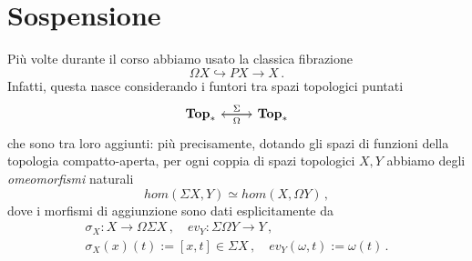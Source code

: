 

\section{Sospensione}

Più volte durante il corso abbiamo usato la classica fibrazione
\begin{equation*}
	\Omega X \hookrightarrow PX \longrightarrow X\,.
\end{equation*}
Infatti, questa nasce considerando i funtori tra
spazi topologici puntati
\begin{equation*}
	\begin{tikzcd}
		\cat{Top}_{*} \ar[r, "\Sigma"] & \cat{Top}_{*} \ar[l, "\Omega"]
	\end{tikzcd}
\end{equation*}
che sono tra loro aggiunti: più precisamente, dotando
gli spazi di funzioni della topologia compatto-aperta,
per ogni coppia di spazi topologici $X,Y$ abbiamo degli 
\emph{omeomorfismi} naturali
\begin{equation*}
	hom(\Sigma X, Y) \simeq hom(X, \Omega Y)\,,
\end{equation*}
dove i morfismi di aggiunzione sono dati esplicitamente da
\begin{align*}
	\sigma_{X} : X \longrightarrow \Omega \Sigma X\,, \quad
	ev_{Y} : \Sigma \Omega Y \longrightarrow Y\,, \\
	\sigma_{X}(x)(t) := [x,t] \in \Sigma X\,, \quad
	ev_{Y}(\omega, t) := \omega(t)\,. 
\end{align*}

